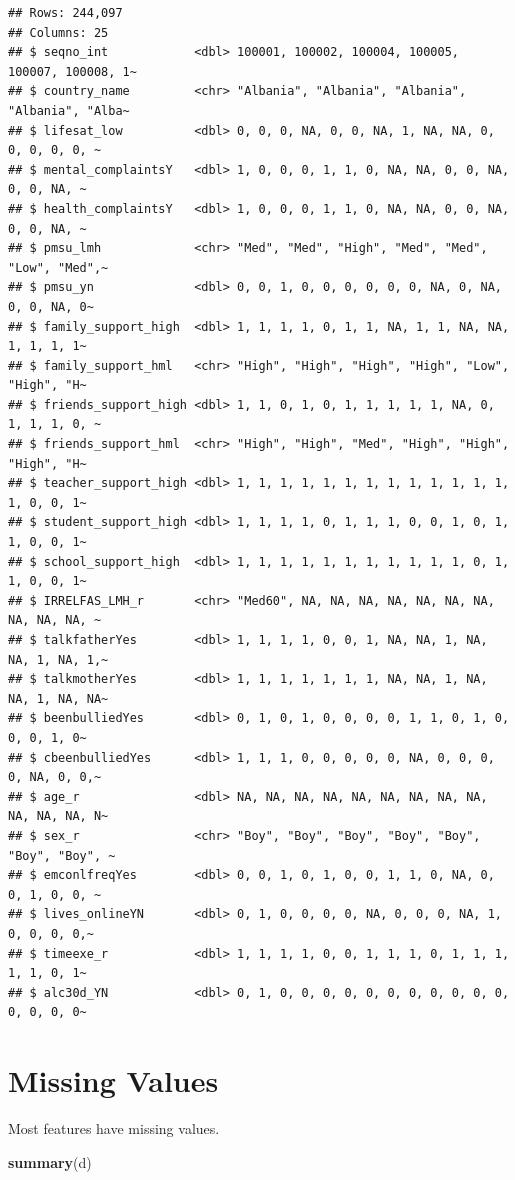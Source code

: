 \documentclass[
]{article}
\newenvironment{Shaded}{\begin{snugshade}}{\end{snugshade}}
\newcommand{\FunctionTok}[1]{\textcolor[rgb]{0.13,0.29,0.53}{\textbf{#1}}}
\newcommand{\NormalTok}[1]{#1}
\begin{document}
\begin{verbatim}
## Rows: 244,097
## Columns: 25
## $ seqno_int            <dbl> 100001, 100002, 100004, 100005, 100007, 100008, 1~
## $ country_name         <chr> "Albania", "Albania", "Albania", "Albania", "Alba~
## $ lifesat_low          <dbl> 0, 0, 0, NA, 0, 0, NA, 1, NA, NA, 0, 0, 0, 0, 0, ~
## $ mental_complaintsY   <dbl> 1, 0, 0, 0, 1, 1, 0, NA, NA, 0, 0, NA, 0, 0, NA, ~
## $ health_complaintsY   <dbl> 1, 0, 0, 0, 1, 1, 0, NA, NA, 0, 0, NA, 0, 0, NA, ~
## $ pmsu_lmh             <chr> "Med", "Med", "High", "Med", "Med", "Low", "Med",~
## $ pmsu_yn              <dbl> 0, 0, 1, 0, 0, 0, 0, 0, 0, NA, 0, NA, 0, 0, NA, 0~
## $ family_support_high  <dbl> 1, 1, 1, 1, 0, 1, 1, NA, 1, 1, NA, NA, 1, 1, 1, 1~
## $ family_support_hml   <chr> "High", "High", "High", "High", "Low", "High", "H~
## $ friends_support_high <dbl> 1, 1, 0, 1, 0, 1, 1, 1, 1, 1, NA, 0, 1, 1, 1, 0, ~
## $ friends_support_hml  <chr> "High", "High", "Med", "High", "High", "High", "H~
## $ teacher_support_high <dbl> 1, 1, 1, 1, 1, 1, 1, 1, 1, 1, 1, 1, 1, 1, 0, 0, 1~
## $ student_support_high <dbl> 1, 1, 1, 1, 0, 1, 1, 1, 0, 0, 1, 0, 1, 1, 0, 0, 1~
## $ school_support_high  <dbl> 1, 1, 1, 1, 1, 1, 1, 1, 1, 1, 1, 0, 1, 1, 0, 0, 1~
## $ IRRELFAS_LMH_r       <chr> "Med60", NA, NA, NA, NA, NA, NA, NA, NA, NA, NA, ~
## $ talkfatherYes        <dbl> 1, 1, 1, 1, 0, 0, 1, NA, NA, 1, NA, NA, 1, NA, 1,~
## $ talkmotherYes        <dbl> 1, 1, 1, 1, 1, 1, 1, NA, NA, 1, NA, NA, 1, NA, NA~
## $ beenbulliedYes       <dbl> 0, 1, 0, 1, 0, 0, 0, 0, 1, 1, 0, 1, 0, 0, 0, 1, 0~
## $ cbeenbulliedYes      <dbl> 1, 1, 1, 0, 0, 0, 0, 0, NA, 0, 0, 0, 0, NA, 0, 0,~
## $ age_r                <dbl> NA, NA, NA, NA, NA, NA, NA, NA, NA, NA, NA, NA, N~
## $ sex_r                <chr> "Boy", "Boy", "Boy", "Boy", "Boy", "Boy", "Boy", ~
## $ emconlfreqYes        <dbl> 0, 0, 1, 0, 1, 0, 0, 1, 1, 0, NA, 0, 0, 1, 0, 0, ~
## $ lives_onlineYN       <dbl> 0, 1, 0, 0, 0, 0, NA, 0, 0, 0, NA, 1, 0, 0, 0, 0,~
## $ timeexe_r            <dbl> 1, 1, 1, 1, 0, 0, 1, 1, 1, 0, 1, 1, 1, 1, 1, 0, 1~
## $ alc30d_YN            <dbl> 0, 1, 0, 0, 0, 0, 0, 0, 0, 0, 0, 0, 0, 0, 0, 0, 0~
\end{verbatim}

\section{Missing Values}\label{missing-values}

Most features have missing values.

\begin{Shaded}
\begin{Highlighting}[]
\FunctionTok{summary}\NormalTok{(d)}
\end{Highlighting}
\end{Shaded}
\end{document}
